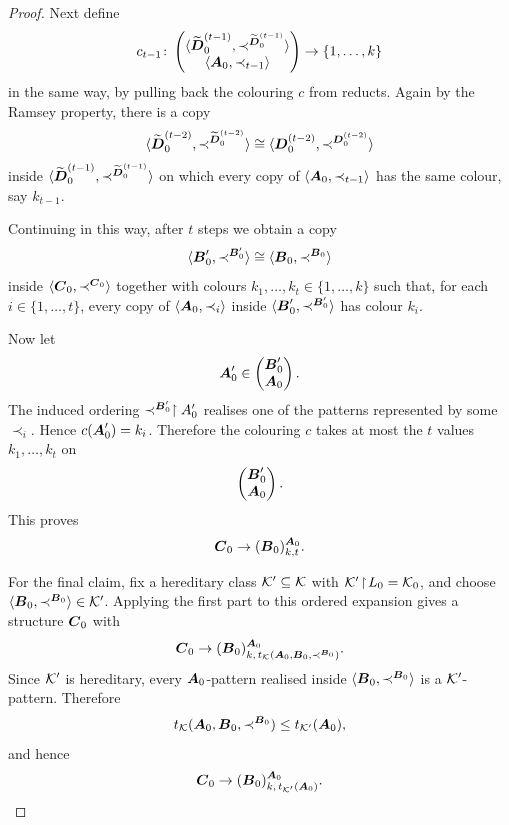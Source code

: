 \begin{proof}
    Next define
    \[
        c_{t-1}\colon
        \begin{pmatrix}
            \langle\widetilde{\boldsymbol{D}}_0^{(t-1)},
            \prec^{\widetilde{\boldsymbol{D}}_0^{(t-1)}}\rangle \\
            \langle\boldsymbol{A}_0,\prec_{t-1}\rangle
        \end{pmatrix}
        \to
        \{1,\dots,k\}
    \]
    in the same way, by pulling back the colouring \(c\) from reducts. Again by the Ramsey property, there is a copy
    \[
        \langle\widetilde{\boldsymbol{D}}_0^{(t-2)},
        \prec^{\widetilde{\boldsymbol{D}}_0^{(t-2)}}\rangle\cong
        \langle\boldsymbol{D}_0^{(t-2)},\prec^{\boldsymbol{D}_0^{(t-2)}}\rangle
    \]
    inside \(\langle\widetilde{\boldsymbol{D}}_0^{(t-1)},
    \prec^{\widetilde{\boldsymbol{D}}_0^{(t-1)}}\rangle\) on which every copy of
    \(\langle\boldsymbol{A}_0,\prec_{t-1}\rangle\) has the same colour, say \(k_{t-1}\).

    Continuing in this way, after \(t\) steps we obtain a copy
    \[
        \langle\boldsymbol{B}_0',\prec^{\boldsymbol{B}_0'}\rangle\cong
        \langle\boldsymbol{B}_0,\prec^{\boldsymbol{B}_0}\rangle
    \]
    inside \(\langle\boldsymbol{C}_0,\prec^{\boldsymbol{C}_0}\rangle\) together with colours
    \(k_1,\dots,k_t\in\{1,\dots,k\}\) such that, for each
    \(i\in\{1,\dots,t\}\), every copy of \(\langle\boldsymbol{A}_0,\prec_i\rangle\)
    inside \(\langle\boldsymbol{B}_0',\prec^{\boldsymbol{B}_0'}\rangle\) has colour \(k_i\).

    Now let
    \[
        \boldsymbol{A}_0'\in\begin{pmatrix}\boldsymbol{B}_0'\\ \boldsymbol{A}_0\end{pmatrix}.
    \]
    The induced ordering \(\prec^{\boldsymbol{B}_0'}\restriction A_0'\) realises one of the patterns represented by some \(\prec_i\). Hence \(c(\boldsymbol{A}_0')=k_i\). Therefore the colouring \(c\) takes at most the \(t\) values \(k_1,\dots,k_t\)
    on
    \[
        \begin{pmatrix}\boldsymbol{B}_0'\\ \boldsymbol{A}_0\end{pmatrix}.
    \]
    This proves
    \[
        \boldsymbol{C}_0\to(\boldsymbol{B}_0)^{\boldsymbol{A}_0}_{k,t}.
    \]

    For the final claim, fix a hereditary class \(\mathcal{K}'\subseteq\mathcal{K}\) with
    \(\mathcal{K}'\!\restriction\!L_0=\mathcal{K}_0\), and choose
    \(\langle\boldsymbol{B}_0,\prec^{\boldsymbol{B}_0}\rangle\in\mathcal{K}'\). Applying the first part
    to this ordered expansion gives a structure \(\boldsymbol{C}_0\) with
    \[
        \boldsymbol{C}_0\to
        (\boldsymbol{B}_0)^{\boldsymbol{A}_0}_{k,\,t_{\mathcal{K}}(\boldsymbol{A}_0,\boldsymbol{B}_0,\prec^{\boldsymbol{B}_0})}.
    \]
    Since \(\mathcal{K}'\) is hereditary, every \(\boldsymbol{A}_0\)-pattern realised inside
    \(\langle\boldsymbol{B}_0,\prec^{\boldsymbol{B}_0}\rangle\) is a \(\mathcal{K}'\)-pattern. Therefore
    \[
        t_{\mathcal{K}}(\boldsymbol{A}_0,\boldsymbol{B}_0,\prec^{\boldsymbol{B}_0})
        \leq t_{\mathcal{K}'}(\boldsymbol{A}_0),
    \]
    and hence
    \[
        \boldsymbol{C}_0\to(\boldsymbol{B}_0)^{\boldsymbol{A}_0}_{k,\,t_{\mathcal{K}'}(\boldsymbol{A}_0)}.
    \]
\end{proof}

